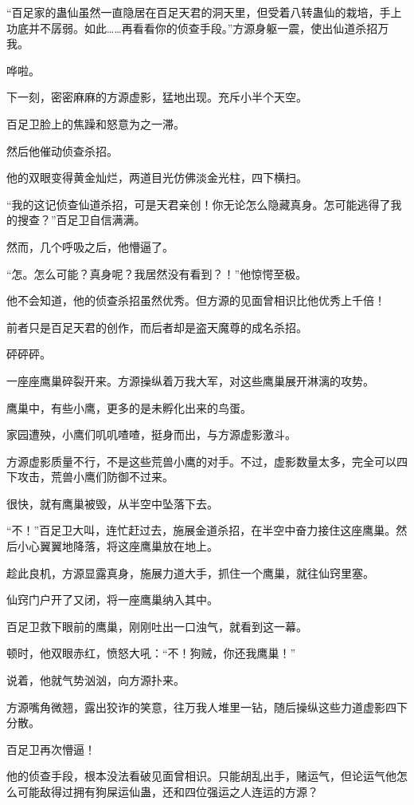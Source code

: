 \begin{this_body}
“百足家的蛊仙虽然一直隐居在百足天君的洞天里，但受着八转蛊仙的栽培，手上功底并不孱弱。如此……再看看你的侦查手段。”方源身躯一震，使出仙道杀招万我。

哗啦。

下一刻，密密麻麻的方源虚影，猛地出现。充斥小半个天空。

百足卫脸上的焦躁和怒意为之一滞。

然后他催动侦查杀招。

他的双眼变得黄金灿烂，两道目光仿佛淡金光柱，四下横扫。

“我的这记侦查仙道杀招，可是天君亲创！你无论怎么隐藏真身。怎可能逃得了我的搜查？”百足卫自信满满。

然而，几个呼吸之后，他懵逼了。

“怎。怎么可能？真身呢？我居然没有看到？！”他惊愕至极。

他不会知道，他的侦查杀招虽然优秀。但方源的见面曾相识比他优秀上千倍！

前者只是百足天君的创作，而后者却是盗天魔尊的成名杀招。

砰砰砰。

一座座鹰巢碎裂开来。方源操纵着万我大军，对这些鹰巢展开淋漓的攻势。

鹰巢中，有些小鹰，更多的是未孵化出来的鸟蛋。

家园遭殃，小鹰们叽叽喳喳，挺身而出，与方源虚影激斗。

方源虚影质量不行，不是这些荒兽小鹰的对手。不过，虚影数量太多，完全可以四下攻击，荒兽小鹰们防御不过来。

很快，就有鹰巢被毁，从半空中坠落下去。

“不！”百足卫大叫，连忙赶过去，施展金道杀招，在半空中奋力接住这座鹰巢。然后小心翼翼地降落，将这座鹰巢放在地上。

趁此良机，方源显露真身，施展力道大手，抓住一个鹰巢，就往仙窍里塞。

仙窍门户开了又闭，将一座鹰巢纳入其中。

百足卫救下眼前的鹰巢，刚刚吐出一口浊气，就看到这一幕。

顿时，他双眼赤红，愤怒大吼：“不！狗贼，你还我鹰巢！”

说着，他就气势汹汹，向方源扑来。

方源嘴角微翘，露出狡诈的笑意，往万我人堆里一钻，随后操纵这些力道虚影四下分散。

百足卫再次懵逼！

他的侦查手段，根本没法看破见面曾相识。只能胡乱出手，赌运气，但论运气他怎么可能敌得过拥有狗屎运仙蛊，还和四位强运之人连运的方源？


\end{this_body}
